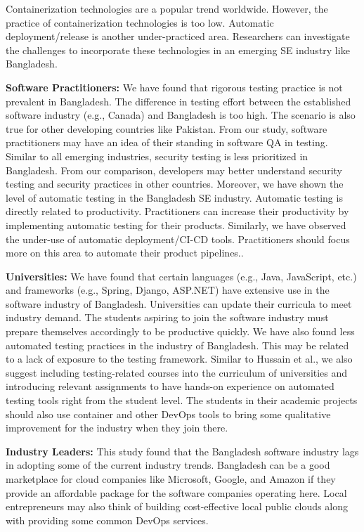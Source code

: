 Containerization technologies are a popular trend worldwide. However, the practice of containerization technologies is too low. Automatic deployment/release is another under-practiced area. Researchers can investigate the challenges to incorporate these technologies in an emerging SE industry like Bangladesh.

\indent \textbf{Software Practitioners:} We have found that rigorous testing practice is not prevalent in Bangladesh. The difference in testing effort between the established software industry (e.g., Canada) and Bangladesh is too high. The scenario is also true for other developing countries like Pakistan. From our study, software practitioners may have an idea of their standing in software QA in testing. Similar to all emerging industries, security testing is less prioritized in Bangladesh. From our comparison, developers may better understand security testing and security practices in other countries. Moreover, we have shown the level of automatic testing in the Bangladesh SE industry. Automatic testing is directly related to productivity. Practitioners can increase their productivity by implementing automatic testing for their products. Similarly, we have observed the under-use of automatic deployment/CI-CD tools. Practitioners should focus more on this area to automate their product pipelines..

\indent \textbf{Universities:} We have found that certain languages (e.g., Java, JavaScript, etc.) and frameworks (e.g., Spring, Django, ASP.NET) have extensive use in the software industry of Bangladesh. Universities can update their curricula to meet industry demand. The students aspiring to join the software industry must prepare themselves accordingly to be productive quickly. We have also found less automated testing practices in the industry of Bangladesh. This may be related to a lack of exposure to the testing framework. Similar to Hussain et al.\cite{Hussain2020}, we also suggest including testing-related courses into the curriculum of universities and introducing relevant assignments to have hands-on experience on automated testing tools right from the student level. The students in their academic projects should also use container and other DevOps tools to bring some qualitative improvement for the industry when they join there.


\indent \textbf{Industry Leaders:} This study found that the Bangladesh software industry lags in adopting some of the current industry trends. Bangladesh can be a good marketplace for cloud companies like Microsoft, Google, and Amazon if they provide an affordable package for the software companies operating here. Local entrepreneurs may also think of building cost-effective local public clouds along with providing some common DevOps services.  

